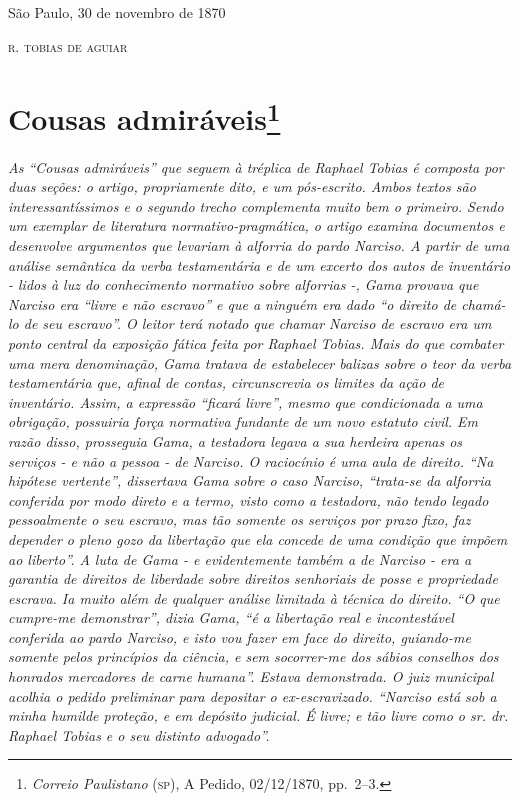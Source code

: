 {\begin{flushright}
São Paulo, 30 de novembro de 1870

\textsc{r. tobias de aguiar}
\end{flushright}

\chapter{Cousas admiráveis\footnote{\emph{Correio Paulistano} (\textsc{sp}), A Pedido, 02/12/1870,
  pp.~2--3.}} %

\begin{didascalia}
\emph{As ``Cousas admiráveis'' que seguem à tréplica de Raphael Tobias é
composta por duas seções: o artigo, propriamente dito, e um pós-escrito.
Ambos textos são interessantíssimos e o segundo trecho complementa muito
bem o primeiro. Sendo um exemplar de literatura normativo-pragmática, o
artigo examina documentos e desenvolve argumentos que levariam à
alforria do pardo Narciso. A partir de uma análise semântica da verba
testamentária e de um excerto dos autos de inventário - lidos à luz do
conhecimento normativo sobre alforrias -, Gama provava que Narciso era
``livre e não escravo'' e que a ninguém era dado ``o direito de chamá-lo de
seu escravo''. O leitor terá notado que chamar Narciso de escravo era um
ponto central da exposição fática feita por Raphael Tobias. Mais do que
combater uma mera denominação, Gama tratava de estabelecer balizas sobre
o teor da verba testamentária que, afinal de contas, circunscrevia os
limites da ação de inventário. Assim, a expressão ``ficará livre'', mesmo
que condicionada a uma obrigação, possuiria força normativa fundante de
um novo estatuto civil. Em razão disso, prosseguia Gama, a testadora
legava a sua herdeira apenas os serviços - e não a pessoa - de Narciso.
O raciocínio é uma aula de direito. ``Na hipótese vertente'', dissertava
Gama sobre o caso Narciso, ``trata-se da alforria conferida por modo
direto e a termo, visto como a testadora, não tendo legado pessoalmente
o seu escravo, mas tão somente os serviços por prazo fixo, faz depender
o pleno gozo da libertação que ela concede de uma condição que impõem ao
liberto''. A luta de Gama - e evidentemente também a de Narciso - era a
garantia de direitos de liberdade sobre direitos senhoriais de posse e
propriedade escrava. Ia muito além de qualquer análise limitada à
técnica do direito. ``O que cumpre-me demonstrar'', dizia Gama, ``é a
libertação real e incontestável conferida ao pardo Narciso, e isto vou
fazer em face do direito, guiando-me somente pelos princípios da
ciência, e sem socorrer-me dos sábios conselhos dos honrados mercadores
de carne humana''. Estava demonstrada. O juiz municipal acolhia o pedido
preliminar para depositar o ex-escravizado. ``Narciso está sob a minha
humilde proteção, e em depósito judicial. É livre; e tão livre como o
sr. dr. Raphael Tobias e o seu distinto advogado''.}
\end{didascalia}

}
